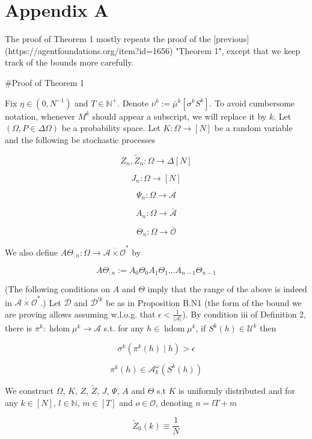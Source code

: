 \documentclass[a4paper]{article}
\newcommand{\Comment}[1]{}
\newcommand{\AP}[1]{\left(#1\right)}
\newcommand{\Nats}{\mathbb{N}}
\newcommand{\Abs}[1]{\left\vert #1 \right\vert}
\newcommand{\Ob}{\mathcal{O}}
\newcommand{\A}{\mathcal{A}}
\newcommand{\Ado}{\bar{\Ob}}
\newcommand{\Ada}{\bar{\A}}
\newcommand{\Adao}{\overline{\A \times \Ob}}
\newcommand{\Adfh}{\Adao^*}
\DeclareMathOperator{\HD}{hdom}
\newcommand{\UC}{\mathcal{U}}
\newcommand{\Dl}{\mathcal{D}}
\newcommand{\F}{\mathcal{F}}
\newcommand{\Z}{Z}
\newcommand{\J}{J}
\begin{document}
\section{Appendix A}

The proof of Theorem 1 mostly repeats the proof of the [previous](https://agentfoundations.org/item?id=1656) "Theorem 1", except that we keep track of the bounds more carefully.

\#Proof of Theorem 1

Fix $\eta\in\left(0,N^{-1}\right)$ and $T \in \Nats^+$. Denote $\nu^k:=\bar{\mu}^k\left[\sigma^k S^k\right]$. To avoid cumbersome notation, whenever $M^k$ should appear a subscript, we will replace it by $k$. Let $(\Omega,P \in \Delta\Omega)$ be a probability space\Comment{ and $\{\F_n \subseteq 2^\Omega\}_{n \in \Nats \sqcup \{-1\}}$ a filtration of $\Omega$}. Let $K: \Omega \rightarrow [N]$ be \Comment{measurable w.r.t. $\F_{-1}$}a random variable and the following be stochastic processes\Comment{ adapted to $\F$}

$$\Z_n,\tilde{\Z}_n: \Omega \rightarrow \Delta[N]$$

$$\J_n: \Omega \rightarrow [N]$$

$$\Psi_n: \Omega \rightarrow \A$$

$$A_n: \Omega \rightarrow \Ada$$

$$\Theta_n: \Omega \rightarrow \Ado$$

We also define $A\Theta_{:n}: \Omega \rightarrow \Adfh$ by

$$A\Theta_{:n}:= A_0\Theta_0A_1\Theta_1 \ldots A_{n-1}\Theta_{n-1}$$

(The following conditions on $A$ and $\Theta$ imply that the range of the above is indeed in $\Adfh$.) Let $\Dl$ and $\Dl^{!k}$ be as in Proposition B.N1 (the form of the bound we are proving allows assuming w.l.o.g. that $\epsilon < \frac{1}{\Abs{\A}}$). By condition iii of Definition 2, there is $\pi^k : \HD{\mu^k} \rightarrow \A$ s.t. for any $h \in \HD{\mu^k}$, if $S^k(h) \in \UC^k$ then

$$\sigma^k\AP{\pi^k(h) \mid h} > \epsilon$$

$$\pi^k(h) \in \A_k^\omega\AP{S^k(h)}$$

We construct $\Omega$\Comment{, $\F$}, $K$, $\Z$, $\tilde{\Z}$, $\J$, $\Psi$, $A$ and $\Theta$ s.t $K$ is uniformly distributed and for any $k \in [N]$, $l \in \Nats$, $m \in [T]$ and $o \in \Ob$, denoting $n = lT+m$

$$\tilde{\Z}_0(k)\equiv\frac{1}{N}$$
\end{document}
